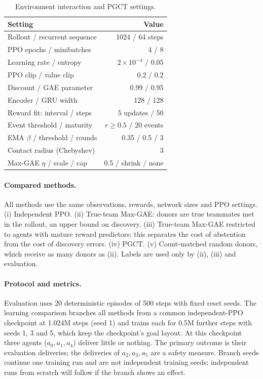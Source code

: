 \documentclass{article}
\begin{document}
\begin{table}[t]\centering\small
\begin{tabular}{lr}\toprule
Setting & Value\\\midrule
Rollout / recurrent sequence & 1024 / 64 steps\\
PPO epochs / minibatches & 4 / 8\\
Learning rate / entropy & $2\times10^{-4}$ / 0.05\\
PPO clip / value clip & 0.2 / 0.2\\
Discount / GAE parameter & 0.99 / 0.95\\
Encoder / GRU width & 128 / 128\\
Reward fit: interval / steps & 5 updates / 50\\
Event threshold / maturity & $r\ge0.5$ / 20 events\\
EMA $\beta$ / threshold / rounds & 0.35 / 0.5 / 3\\
Contact radius (Chebyshev) & 3\\
Max-GAE $\eta$ / scale / cap & 0.5 / shrink / none\\\bottomrule
\end{tabular}
\caption{Environment interaction and PGCT settings.}\label{tab:settings}
\end{table}

\paragraph{Compared methods.} All methods use the same observations, rewards, network sizes and PPO settings. (i) Independent PPO. (ii) True-team Max-GAE: donors are true teammates met in the rollout, an upper bound on discovery. (iii) True-team Max-GAE restricted to agents with mature reward predictors; this separates the cost of abstention from the cost of discovery errors. (iv) PGCT. (v) Count-matched random donors, which receive as many donors as (ii). Labels are used only by (ii), (iii) and evaluation.

\paragraph{Protocol and metrics.} Evaluation uses 20 deterministic episodes of 500 steps with fixed reset seeds. The learning comparison branches all methods from a common independent-PPO checkpoint at 1.024M steps (seed 1) and trains each for 0.5M further steps with seeds 1, 3 and 5, which keep the checkpoint's goal layout. At this checkpoint three agents ($a_0,a_1,a_4$) deliver little or nothing. The primary outcome is their evaluation deliveries; the deliveries of $a_2,a_3,a_5$ are a safety measure. Branch seeds continue one training run and are not independent training seeds; independent runs from scratch will follow if the branch shows an effect.
\end{document}
